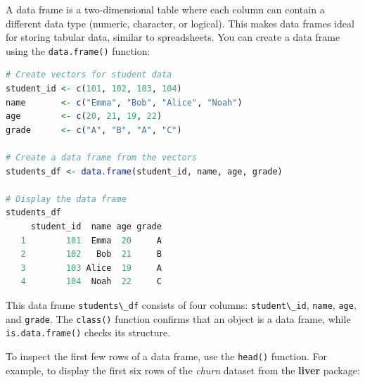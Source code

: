 \documentclass[
  11pt,
]{book}
\newcommand{\passthrough}[1]{#1}
\theoremstyle{definition}
\theoremstyle{definition}
\theoremstyle{definition}
\theoremstyle{definition}
\theoremstyle{remark}
\begin{document}
A data frame is a two-dimensional table where each column can contain a different data type (numeric, character, or logical). This makes data frames ideal for storing tabular data, similar to spreadsheets. You can create a data frame using the \passthrough{\lstinline!data.frame()!} function:

\begin{lstlisting}[language=R]
# Create vectors for student data
student_id <- c(101, 102, 103, 104)
name       <- c("Emma", "Bob", "Alice", "Noah")
age        <- c(20, 21, 19, 22)
grade      <- c("A", "B", "A", "C")

# Create a data frame from the vectors
students_df <- data.frame(student_id, name, age, grade)

# Display the data frame
students_df
     student_id  name age grade
   1        101  Emma  20     A
   2        102   Bob  21     B
   3        103 Alice  19     A
   4        104  Noah  22     C
\end{lstlisting}

This data frame \passthrough{\lstinline!students\_df!} consists of four columns: \passthrough{\lstinline!student\_id!}, \passthrough{\lstinline!name!}, \passthrough{\lstinline!age!}, and \passthrough{\lstinline!grade!}. The \passthrough{\lstinline!class()!} function confirms that an object is a data frame, while \passthrough{\lstinline!is.data.frame()!} checks its structure.

To inspect the first few rows of a data frame, use the \passthrough{\lstinline!head()!} function. For example, to display the first six rows of the \emph{churn} dataset from the \textbf{liver} package:
\end{document}
